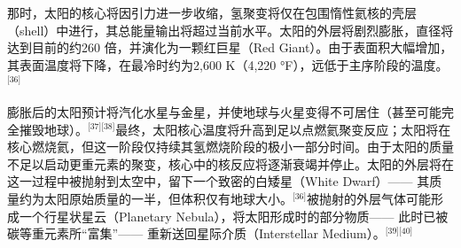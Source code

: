 那时，太阳的核心将因引力进一步收缩，氢聚变将仅在包围惰性氦核的壳层（shell）中进行，其总能量输出将超过当前水平。太阳的外层将剧烈膨胀，直径将达到目前的约260 倍，并演化为一颗红巨星（Red Giant）。由于表面积大幅增加，其表面温度将下降，在最冷时约为2,600 K（4,220 °F），远低于主序阶段的温度。\(^\text{[36]}\)

膨胀后的太阳预计将汽化水星与金星，并使地球与火星变得不可居住（甚至可能完全摧毁地球）。\(^\text{[37][38]}\)最终，太阳核心温度将升高到足以点燃氦聚变反应；太阳将在核心燃烧氦，但这一阶段仅持续其氢燃烧阶段的极小一部分时间。由于太阳的质量不足以启动更重元素的聚变，核心中的核反应将逐渐衰竭并停止。太阳的外层将在这一过程中被抛射到太空中，留下一个致密的白矮星（White Dwarf）—— 其质量约为太阳原始质量的一半，但体积仅有地球大小。\(^\text{[36]}\)被抛射的外层气体可能形成一个行星状星云（Planetary Nebula），将太阳形成时的部分物质—— 此时已被碳等重元素所“富集”—— 重新送回星际介质（Interstellar Medium）。\(^\text{[39][40]}\)

